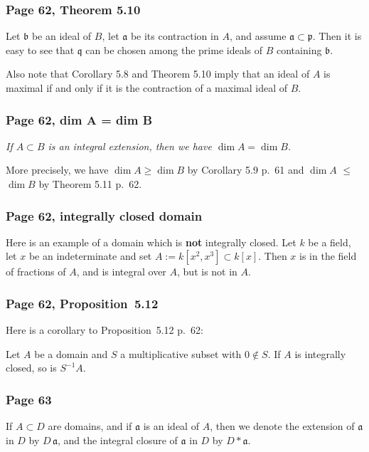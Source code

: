 \documentclass[12pt,letterpaper]{article}%
\newcommand{\mf}{\mathfrak}
\newcommand{\aaa}{\mf a}
\newcommand{\bbb}{\mf b}
\newcommand{\ppp}{\mf p}
\newcommand{\qqq}{\mf q}
\newcommand{\nn}{\noindent}
\begin{document}
\subsubsection{Page 62, Theorem 5.10}\label{510}%

Let $\bbb$ be an ideal of $B$, let $\aaa$ be its contraction in $A$, and assume $\aaa\subset\ppp$. Then it is easy to see that $\qqq$ can be chosen among the prime ideals of $B$ containing $\bbb$. 

Also note that Corollary 5.8 and Theorem 5.10 imply that an ideal of $A$ is maximal if and only if it is the contraction of a maximal ideal of $B$. 

\subsubsection{Page 62, dim A = dim B}%

\nn\emph{If $A\subset B$ is an integral extension, then we have $\dim A=\dim B$.}

More precisely, we have $\dim A\ge\dim B$ by Corollary 5.9 p.~61 and $\dim A$ $\le$ $\dim B$ by Theorem 5.11 p.~62.

\subsubsection{Page 62, integrally closed domain}%

Here is an example of a domain which is \textbf{not} integrally closed. Let $k$ be a field, let $x$ be an indeterminate and set $A:=k[x^2,x^3]\subset k[x]$. Then $x$ is in the field of fractions of $A$, and is integral over $A$, but is not in $A$.

\subsubsection{Page 62, Proposition~5.12}\label{p5.12}%

Here is a corollary to Proposition~5.12 p.~62:

Let $A$ be a domain and $S$ a multiplicative subset with $0\notin S$. If $A$ is integrally closed, so is $S^{-1}A$.

\subsubsection{Page 63}%

If $A\subset D$ are domains, and if $\aaa$ is an ideal of $A$, then we denote the extension of $\aaa$ in $D$ by $D\,\aaa$, and the integral closure of $\aaa$ in $D$ by $D*\aaa$. 
\end{document}
